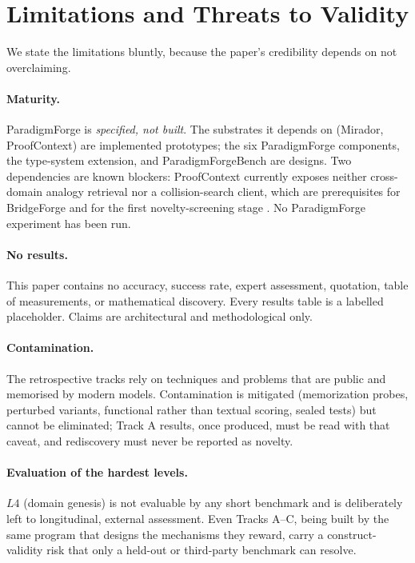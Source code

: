 \documentclass[11pt]{article}
\theoremstyle{definition}
\theoremstyle{remark}
\newcommand{\pfbench}{ParadigmForgeBench}
\newcommand{\PF}{ParadigmForge}
\begin{document}
\section{Limitations and Threats to Validity}
\label{sec:limits}

We state the limitations bluntly, because the paper's credibility depends on not overclaiming.

\paragraph{Maturity.} \PF{} is \emph{specified, not built}. The substrates it depends on (Mirador,
ProofContext) are implemented prototypes; the six \PF{} components, the type-system extension, and
\pfbench{} are designs. Two dependencies are known blockers: ProofContext currently exposes neither
cross-domain analogy retrieval nor a collision-search client, which are prerequisites for BridgeForge
and for the first novelty-screening stage \citep{lucius2026theoryforge}. No \PF{} experiment has been
run.

\paragraph{No results.} This paper contains no accuracy, success rate, expert assessment, quotation,
table of measurements, or mathematical discovery. Every results table is a labelled placeholder.
Claims are architectural and methodological only.

\paragraph{Contamination.} The retrospective tracks rely on techniques and problems that are public
and memorised by modern models. Contamination is mitigated (memorization probes, perturbed variants,
functional rather than textual scoring, sealed tests) but cannot be eliminated; Track A results, once
produced, must be read with that caveat, and rediscovery must never be reported as novelty.

\paragraph{Evaluation of the hardest levels.} $L4$ (domain genesis) is not evaluable by any short
benchmark and is deliberately left to longitudinal, external assessment. Even Tracks A--C, being
built by the same program that designs the mechanisms they reward, carry a construct-validity risk
that only a held-out or third-party benchmark can resolve.
\end{document}
